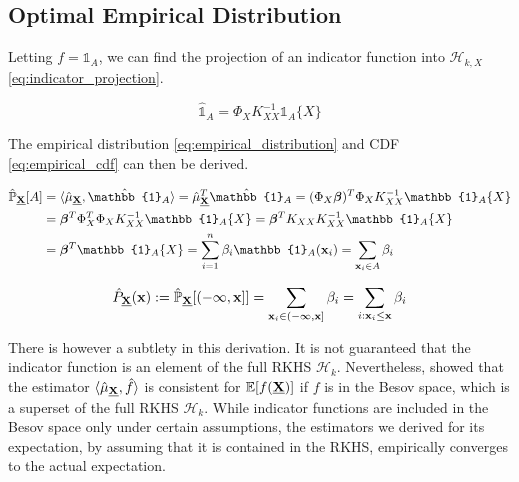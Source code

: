 \documentclass[twoside]{article} \usepackage{aistats2017}
\theoremstyle{definition}
\theoremstyle{remark}
\newcommand{\rv}[1]{\underline{#1}}
\newcommand{\ds}[1]{{#1}}
\begin{document}
	\subsection{Optimal Empirical Distribution}
	\label{sec:discriminative_quantile_regression:optimal_empirical_distribution}
	
		Letting $f = \mathbb{1}_{A}$, we can find the projection of an indicator function into $\mathcal{H}_{k, \ds{X}}$ \eqref{eq:indicator_projection}.
		
		\begin{equation}
			\hat{\mathbb{1}}_{A} = \Phi_{\ds{X}} K_{\ds{X} \ds{X}}^{-1} \mathbb{1}_{A}\{\ds{X}\}
		\label{eq:indicator_projection}
		\end{equation}
		
		The empirical distribution \eqref{eq:empirical_distribution} and CDF \eqref{eq:empirical_cdf} can then be derived.

		\begin{equation}
		\begin{aligned}
			\hat{\mathbb{P}}_{\bvec{\rv{X}}}[A] &= \langle \hat{\mu}_{\bvec{\rv{X}}}, \hat{\mathbb{1}}_{A} \rangle = \hat{\mu}_{\bvec{\rv{X}}}^{T}\hat{\mathbb{1}}_{A} = (\Phi_{\ds{X}} \bm{\beta})^{T} \Phi_{\ds{X}} K_{\ds{X} \ds{X}}^{-1} \mathbb{1}_{A}\{\ds{X}\} \\
			&= \bm{\beta}^{T} \Phi_{\ds{X}}^{T} \Phi_{\ds{X}} K_{\ds{X} \ds{X}}^{-1} \mathbb{1}_{A}\{\ds{X}\} = \bm{\beta}^{T} K_{\ds{X} \ds{X}} K_{\ds{X} \ds{X}}^{-1} \mathbb{1}_{A}\{\ds{X}\} \\
			&= \bm{\beta}^{T} \mathbb{1}_{A}\{\ds{X}\} = \sum_{i = 1}^{n} \beta_{i} \mathbb{1}_{A}(\bvec{x}_{i}) = \sum_{\bvec{x}_{i} \in A} \beta_{i}
		\end{aligned}
		\label{eq:empirical_distribution}
		\end{equation}

		\begin{equation}
			\hat{P}_{\bvec{\rv{X}}}(\bvec{x}) := \hat{\mathbb{P}}_{\bvec{\rv{X}}}[(-\bvec{\infty}, \bvec{x}]] = \sum_{\bvec{x}_{i} \in (-\bvec{\infty}, \bvec{x}]} \beta_{i} = \sum_{i : \bvec{x}_{i} \leq \bvec{x}} \beta_{i}
		\label{eq:empirical_cdf}
		\end{equation}

		There is however a subtlety in this derivation. It is not guaranteed that the indicator function is an element of the full RKHS $\mathcal{H}_{k}$. Nevertheless, \cite{Kanagawa:RecoveringDistributions} showed that the estimator $\langle \hat{\mu}_{\bvec{\rv{X}}}, \hat{f} \rangle$ is consistent for $\mathbb{E}[f(\bvec{\rv{X}})]$ if $f$ is in the Besov space, which is a superset of the full RKHS $\mathcal{H}_{k}$. While indicator functions are included in the Besov space only under certain assumptions, the estimators we derived for its expectation, by assuming that it is contained in the RKHS, empirically converges to the actual expectation.
\end{document}

